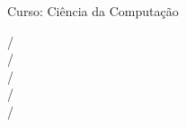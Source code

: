 \begin{center}
  \universidadePaulista

  Curso: Ciência da Computação

  \polo

  \vspace{8cm}

  \textbf{\titulo}

  \vspace{3cm}

  \begingroup
  \fontsize{12pt}{15pt}\selectfont
  \begin{flushright}
    {\emanuel} / \raEmanuel\\
    {\henrique} / \raHenrique\\
    {\lucas} / \raLucas\\
    {\valerio} / \raValerio\\
    {\wanderson} / \raWanderson
  \end{flushright}
  \endgroup

  \vspace{4cm}

  \cidade

  \ano
\end{center}

\thispagestyle{empty}
\newpage
